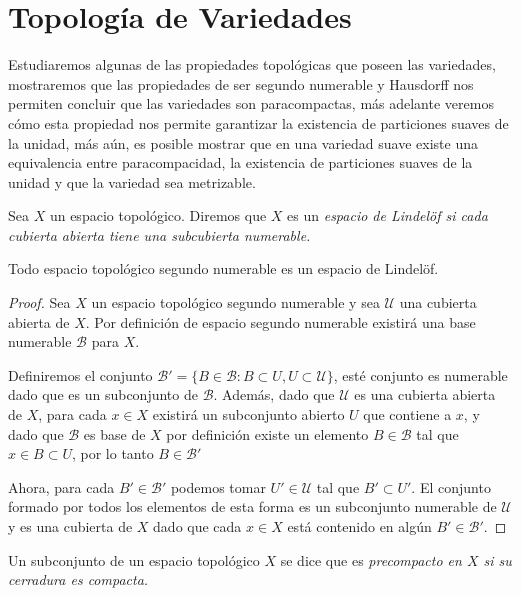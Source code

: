 \appendix
\chapter{Topología de Variedades}\label{Anexo: Topologia De Variedades}
Estudiaremos algunas de las propiedades topológicas que poseen las variedades, mostraremos que las propiedades de ser segundo numerable y Hausdorff nos permiten concluir que las variedades son paracompactas, más adelante veremos cómo esta propiedad nos permite garantizar la existencia de particiones suaves de la unidad, más aún, es posible mostrar que en una variedad suave existe una equivalencia entre paracompacidad, la existencia de particiones suaves de la unidad y que la variedad sea metrizable.

\begin{definition}\label{Definición: Lindelöf}
  Sea $X$ un espacio topológico. Diremos que $X$ es un \it{espacio de Lindelöf} si cada cubierta abierta tiene una subcubierta numerable.
\end{definition}

\begin{theorem}
  Todo espacio topológico segundo numerable es un espacio de Lindelöf.
\end{theorem}

\begin{proof}
  Sea $X$ un espacio topológico segundo numerable y sea $\mathcal{U}$ una cubierta abierta de $X$. Por definición de espacio segundo numerable existirá una base numerable $\mathcal{B}$ para $X$.

  Definiremos el conjunto $\mathcal{B}' = \{B \in \mathcal{B} : B \subset U, U \subset \mathcal{U}\}$, esté conjunto es numerable dado que es un subconjunto de $\mathcal{B}$. Además, dado que $\mathcal{U}$ es una cubierta abierta de $X$, para cada $x \in X$ existirá un subconjunto abierto $U$ que contiene a $x$, y dado que $\mathcal{B}$ es base de $X$ por definición existe un elemento $B \in \mathcal{B}$ tal que $x \in B \subset U$, por lo tanto $B \in \mathcal{B}'$

  Ahora, para cada $B' \in \mathcal{B}'$ podemos tomar $U' \in \mathcal{U}$ tal que $B' \subset U'$. El conjunto formado por todos los elementos de esta forma es un subconjunto numerable de $\mathcal{U}$ y es una cubierta de $X$ dado que cada $x \in X$ está contenido en algún $B' \in \mathcal{B}'$.
\end{proof}

\begin{definition}\label{Definición: Subconjunto Precompacto}
  Un subconjunto de un espacio topológico $X$ se dice que es \it{precompacto} en $X$ si su cerradura es compacta. 
\end{definition} 


